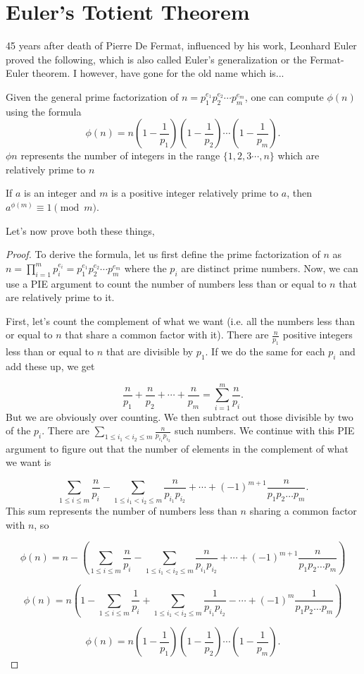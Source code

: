 \section{Euler's Totient Theorem}
45 years after death of Pierre De Fermat, influenced by his work, Leonhard Euler proved the following, which is also called Euler's generalization or the Fermat-Euler theorem. I however, have gone for the old name which is...
\begin{theorem}
    Given the general prime factorization of ${n} = {p}_1^{e_1}{p}_2^{e_2} \cdots {p}_m^{e_m}$, one can compute $\phi(n)$ using the formula\[\phi(n)= n\left(1-\frac{1}{p_1} \right) \left(1-\frac{1}{p_2} \right)\cdots \left(1-\frac{1}{p_m}\right).\]
    $\phi{n}$ represents the number of integers in the range $\{1,2,3\cdots{,n}\}$ which are relatively prime to $n$
\end{theorem}
\begin{theorem}
    If ${a}$ is an integer and $m$ is a positive integer relatively prime to $a$, then ${a}^{\phi (m)}\equiv 1 \pmod {m}$.
\end{theorem}
Let's now prove both these things, 
\begin{proof}
    To derive the formula, let us first define the prime factorization of $n$ as $n =\prod_{i=1}^{m}p_i^{e_i} =p_1^{e_1}p_2^{e_2}\cdots p_m^{e_m}$ where the $p_i$ are distinct prime numbers. Now, we can use a PIE argument to count the number of numbers less than or equal to $n$ that are relatively prime to it.

First, let's count the complement of what we want (i.e. all the numbers less than or equal to $n$ that share a common factor with it). There are $\frac{n}{p_1}$ positive integers less than or equal to $n$ that are divisible by $p_1$. If we do the same for each $p_i$ and add these up, we get

\[\frac{n}{p_1} + \frac{n}{p_2} + \cdots + \frac{n}{p_m} = \sum^m_{i=1}\frac{n}{p_i}.\]
But we are obviously over counting. We then subtract out those divisible by two of the $p_i$. There are $\sum_{1 \le i_1 < i_2 \le m}\frac{n}{p_{i_1}p_{i_2}}$ such numbers. We continue with this PIE argument to figure out that the number of elements in the complement of what we want is

\[\sum_{1 \le i \le m}\frac{n}{p_i} - \sum_{1 \le i_1 < i_2 \le m}\frac{n}{p_{i_1}p_{i_2}} + \cdots + (-1)^{m+1}\frac{n}{p_1p_2\ldots p_m}.\]
This sum represents the number of numbers less than $n$ sharing a common factor with $n$, so

\[\phi(n) = n - \left(\sum_{1 \le i \le m}\frac{n}{p_i}- \sum_{1 \le i_1 < i_2 \le m}\frac{n}{p_{i_1}p_{i_2}} + \cdots + (-1)^{m+1}\frac{n}{p_1p_2\ldots p_m}\right)\]

\[\phi(n)= n\left(1 - \sum_{1 \le i \le m}\frac{1}{p_i} + \sum_{1 \le i_1 < i_2 \le m}\frac{1}{p_{i_1}p_{i_2}} - \cdots + (-1)^{m}\frac{1}{p_1p_2\ldots p_m}\right)\]

\[\phi(n)= n\left(1-\frac{1}{p_1} \right) \left(1-\frac{1}{p_2} \right)\cdots \left(1-\frac{1}{p_m}\right).\]
\end{proof}
